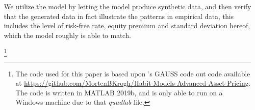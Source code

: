 
We utilize the model by letting the model produce synthetic data, and then verify that the generated data in fact illustrate the patterns in empirical data, this includes the level of risk-free rate, equity premium and standard deviation hereof, which the model roughly is able to match. 





\footnote{The code used for this paper is based upon \cite{Campbell1999}'s GAUSS code out code available at \url{https://github.com/MortenBKrogh/Habit-Models-Advanced-Asset-Pricing}. The code is written in MATLAB 2019b, and is only able to run on a Windows machine due to that \textit{quadlab} file.}















